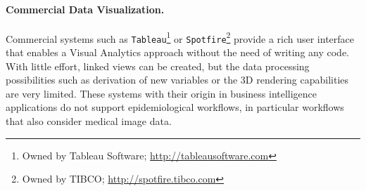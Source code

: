 \documentclass[journal]{style/vgtc} 			          %
\begin{document}
\paragraph{Commercial Data Visualization.}
Commercial systems such as \texttt{Tableau}\footnote{Owned by Tableau Software; \url{http://tableausoftware.com}} or \texttt{Spotfire}\footnote{Owned by TIBCO; \url{http://spotfire.tibco.com}} provide a rich user interface that enables a Visual Analytics approach without the need of writing any code.
%
With little effort, linked views can be created, but the data processing possibilities such as derivation of new variables or the 3D rendering capabilities are very limited.
%
These systems with their origin in business intelligence applications do not support epidemiological workflows, in particular workflows that also consider medical image data.
\end{document}
